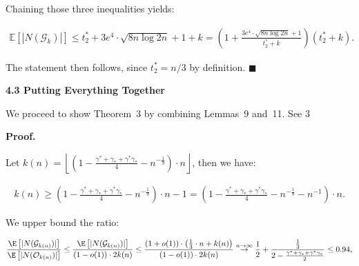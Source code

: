 Chaining those three inequalities yields:\par


\[\begin{gathered}
\mathbb{E}\left[|N(\mathcal{G}_{k})|\right]\leq t^{*}_{2}+3e^{4}\cdot\sqrt{8n\log{2n}}+1+k=\left(1+\frac{3e^{4}\cdot\sqrt{8n\log{2n}}+1}{t^{*}_{2}+k}\right)(t^{*}_{2}+k).
\end{gathered}\]


The statement then follows, since $t^{*}_{2}=n/3$ by definition.
\ensuremath{\blacksquare}\par






\par\medskip\noindent\textbf{4.3 Putting Everything Together}\par




We proceed to show Theorem 3 by combining Lemmas 9 and 11.
See 3\par




\par\medskip\noindent\textbf{Proof.}\par



Let $k(n)=\left\lfloor\left(1-\frac{\gamma^{*}+\gamma_{*}+\gamma^{*}\gamma_{*}}{4}-n^{-\frac{1}{9}}\right)\cdot n\right\rfloor$, then we have:\par


\[\begin{gathered}
\displaystyle k(n)\geq\left(1-\frac{\gamma^{*}+\gamma_{*}+\gamma^{*}\gamma_{*}}{4}-n^{-\frac{1}{9}}\right)\cdot n-1=\left(1-\frac{\gamma^{*}+\gamma_{*}+\gamma^{*}\gamma_{*}}{4}-n^{-\frac{1}{9}}-n^{-1}\right)\cdot n.
\end{gathered}\]


We upper bound the ratio:\par


\[\begin{gathered}
\displaystyle\frac{\E\left[|N(\mathcal{G}_{k(n)})|\right]}{\E\left[|N(\mathcal{O}_{k(n)})|\right]}\leq\frac{\E\left[|N(\mathcal{G}_{k(n)})|\right]}{(1-o(1))\cdot 2k(n)}\leq\frac{(1+o(1))\cdot\left(\frac{1}{3}\cdot n+k(n)\right)}{(1-o(1))\cdot 2k(n)}\overset{n\rightarrow\infty}{\rightarrow}\frac{1}{2}+\frac{\frac{1}{3}}{2-\frac{\gamma^{*}+\gamma_{*}+\gamma^{*}\gamma_{*}}{2}}\leq 0.94,
\end{gathered}\]


